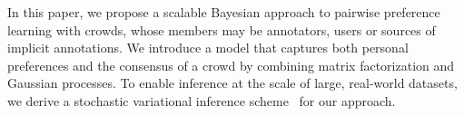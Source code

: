 In this paper, we propose a scalable Bayesian approach to pairwise preference learning with crowds,
whose members may be annotators, users or sources of implicit annotations.
We introduce a model that %
captures both personal preferences and the consensus of a crowd by combining 
matrix factorization and Gaussian processes. %
To enable inference at the scale of large, real-world datasets,
we derive a stochastic variational inference scheme~\citep{hoffman2013stochastic} for our approach.
